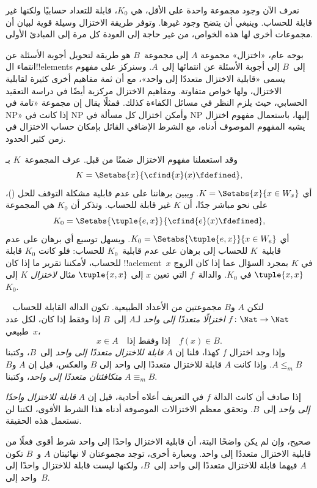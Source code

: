 \documentclass[../../../include/open-logic-section]{subfiles}
\begin{document}

\begin{explain}
نعرف الآن وجود مجموعة واحدة على الأقل، هي $K_0$، قابلة للتعداد حسابيًا
ولكنها غير قابلة للحساب. وينبغي أن يتضح وجود غيرها. وتوفر طريقة
الاختزال وسيلة قوية لبيان أن مجموعات أخرى لها هذه الخواص، من غير حاجة
إلى العودة كل مرة إلى المبادئ الأولى.

بوجه عام، «اختزال» مجموعة $A$ إلى مجموعة~$B$ هو طريقة لتحويل أجوبة
الأسئلة عن انتماء ال!!{element}s إلى~$B$ إلى أجوبة الأسئلة عن انتمائها
إلى~$A$. وسنركز على مفهوم يسمى «قابلية الاختزال متعددًا إلى واحد»، مع
أن ثمة مفاهيم أخرى كثيرة لقابلية الاختزال، ولها خواص متفاوتة. ومفاهيم
الاختزال مركزية أيضًا في دراسة التعقيد الحسابي، حيث يلزم النظر في مسائل
الكفاءة كذلك. فمثلًا يقال إن مجموعة «تامة في NP» إذا كانت في NP وأمكن
اختزال كل مسألة في NP إليها، باستعمال مفهوم اختزال يشبه المفهوم الموصوف
أدناه، مع الشرط الإضافي القائل بإمكان حساب الاختزال في زمن كثير الحدود.

وقد استعملنا مفهوم الاختزال ضمنًا من قبل. عرف المجموعة~$K$ بـ
\[
K = \Setabs{x}{\cfind{x}(x) \fdefined},
\]
أي $K=\Setabs{x}{x\in W_x}$. ويبين برهاننا على عدم قابلية مشكلة
التوقف للحل ()، على نحو مباشر جدًا، أن
$K$ غير قابلة للحساب. وتذكر أن $K_0$ هي المجموعة
\[
K_0 = \Setabs{\tuple{e, x}}{\cfind{e}(x) \fdefined },
\]
أي $K_0=\Setabs{\tuple{e,x}}{x\in W_e}$. ويسهل توسيع أي برهان على
عدم قابلية~$K$ للحساب إلى برهان على عدم قابلية~$K_0$ للحساب: فلو كانت
$K_0$ قابلة للحساب، لأمكننا تقرير ما إذا كان !!a{element}~$x$ في $K$
بمجرد السؤال عما إذا كان الزوج $\tuple{x,x}$ في $K_0$. والدالة~$f$
التي تعين $x$ إلى $\tuple{x,x}$ مثال \emph{لاختزال} $K$ إلى $K_0$.
\end{explain}

\begin{defn}
لتكن $A$ و$B$ مجموعتين من الأعداد الطبيعية. تكون الدالة القابلة للحساب
~$f\colon\Nat\to\Nat$ \emph{اختزالًا متعددًا إلى واحد} لـ$A$ إلى~$B$
إذا وفقط إذا كان، لكل عدد طبيعي~$x$،
\[
x \in A \quad \text{إذا وفقط إذا} \quad f(x) \in B.
\]
وإذا وجد اختزال $f$ كهذا، قلنا إن $A$ \emph{قابلة للاختزال متعددًا
إلى واحد} إلى~$B$، وكتبنا $A\leq_m B$. وإذا كانت $A$ قابلة للاختزال
متعددًا إلى واحد إلى $B$ والعكس، قيل إن $A$ و$B$ \emph{متكافئتان
متعددًا إلى واحد}، وكتبنا $A\equiv_m B$.
\end{defn}

إذا صادف أن كانت الدالة $f$ في التعريف أعلاه أحادية، قيل إن $A$
\emph{قابلة للاختزال واحدًا إلى واحد} إلى~$B$. وتحقق معظم الاختزالات
الموصوفة أدناه هذا الشرط الأقوى، لكننا لن نستعمل هذه الحقيقة.

\begin{digress}
صحيح، وإن لم يكن واضحًا البتة، أن قابلية الاختزال واحدًا إلى واحد شرط
أقوى فعلًا من قابلية الاختزال متعددًا إلى واحد. وبعبارة أخرى، توجد
مجموعتان لا نهائيتان $A$ و~$B$ تكون $A$ فيهما قابلة للاختزال متعددًا
إلى واحد إلى~$B$، ولكنها ليست قابلة للاختزال واحدًا إلى واحد إلى~$B$.
\end{digress}
\end{document}
